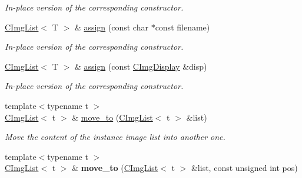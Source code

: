 \begin{DoxyCompactItemize}
\begin{DoxyCompactList}\small\item\em In-\/place version of the corresponding constructor. \item\end{DoxyCompactList}\item 
\hypertarget{structcimg__library_1_1CImgList_a15514475aae54fae9ea5cbd516579095}{
\hyperlink{structcimg__library_1_1CImgList}{CImgList}$<$ T $>$ \& \hyperlink{structcimg__library_1_1CImgList_a15514475aae54fae9ea5cbd516579095}{assign} (const char $\ast$const filename)}
\label{structcimg__library_1_1CImgList_a15514475aae54fae9ea5cbd516579095}

\begin{DoxyCompactList}\small\item\em In-\/place version of the corresponding constructor. \item\end{DoxyCompactList}\item 
\hypertarget{structcimg__library_1_1CImgList_a28925892f3d3cc6594ee78a4b906154f}{
\hyperlink{structcimg__library_1_1CImgList}{CImgList}$<$ T $>$ \& \hyperlink{structcimg__library_1_1CImgList_a28925892f3d3cc6594ee78a4b906154f}{assign} (const \hyperlink{structcimg__library_1_1CImgDisplay}{CImgDisplay} \&disp)}
\label{structcimg__library_1_1CImgList_a28925892f3d3cc6594ee78a4b906154f}

\begin{DoxyCompactList}\small\item\em In-\/place version of the corresponding constructor. \item\end{DoxyCompactList}\item 
\hypertarget{structcimg__library_1_1CImgList_aa38fe7f2a57aa1cf304bde222f25272d}{
{\footnotesize template$<$typename t $>$ }\\\hyperlink{structcimg__library_1_1CImgList}{CImgList}$<$ t $>$ \& \hyperlink{structcimg__library_1_1CImgList_aa38fe7f2a57aa1cf304bde222f25272d}{move\_\-to} (\hyperlink{structcimg__library_1_1CImgList}{CImgList}$<$ t $>$ \&list)}
\label{structcimg__library_1_1CImgList_aa38fe7f2a57aa1cf304bde222f25272d}

\begin{DoxyCompactList}\small\item\em Move the content of the instance image list into another one. \item\end{DoxyCompactList}\item 
\hypertarget{structcimg__library_1_1CImgList_a31d79df0a69a3283125c17f3190715b5}{
{\footnotesize template$<$typename t $>$ }\\\hyperlink{structcimg__library_1_1CImgList}{CImgList}$<$ t $>$ \& {\bfseries move\_\-to} (\hyperlink{structcimg__library_1_1CImgList}{CImgList}$<$ t $>$ \&list, const unsigned int pos)}
\label{structcimg__library_1_1CImgList_a31d79df0a69a3283125c17f3190715b5}


\end{DoxyCompactItemize}
